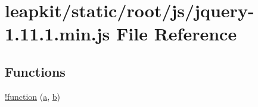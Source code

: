 \hypertarget{static_2root_2js_2jquery-1_811_81_8min_8js}{\section{leapkit/static/root/js/jquery-\/1.11.1.min.\-js File Reference}
\label{static_2root_2js_2jquery-1_811_81_8min_8js}
}
\subsection*{Functions}
\begin{DoxyCompactItemize}
\item 
\hyperlink{static_2root_2js_2jquery-1_811_81_8min_8js_a43f0b96ea8ec44ca20ba86809a785614}{!function} (\hyperlink{static_2root_2js_2bootstrap_2bootstrap_8min_8js_a7c466d2f938d0774841daa80edf7b839}{a}, \hyperlink{quill_8min_8js_ae02349c58306210e3fd20abc63482e9a}{b})
\item 

\end{DoxyCompactItemize}
